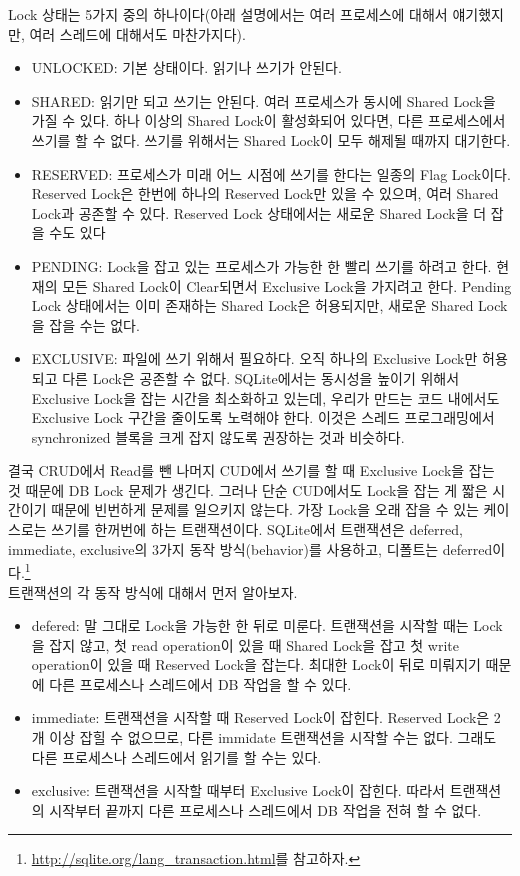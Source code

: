 Lock 상태는 5가지 중의 하나이다(아래 설명에서는 여러 프로세스에 대해서 얘기했지만, 여러 스레드에 대해서도 마찬가지다).
\begin{itemize}
\item UNLOCKED: 기본 상태이다. 읽기나 쓰기가 안된다.
\item SHARED: 읽기만 되고 쓰기는 안된다. 여러 프로세스가 동시에 Shared Lock을 가질 수 있다. 하나 이상의 Shared Lock이 활성화되어 있다면, 다른 프로세스에서 쓰기를 할 수 없다. 쓰기를 위해서는 Shared Lock이 모두 해제될 때까지 대기한다.
\item RESERVED: 프로세스가 미래 어느 시점에 쓰기를 한다는 일종의 Flag Lock이다. Reserved Lock은 한번에 하나의 Reserved Lock만 있을 수 있으며, 여러 Shared Lock과 공존할 수 있다. Reserved Lock 상태에서는 새로운 Shared Lock을 더 잡을 수도 있다 
\item PENDING: Lock을 잡고 있는 프로세스가 가능한 한 빨리 쓰기를 하려고 한다. 현재의 모든 Shared Lock이 Clear되면서 Exclusive Lock을 가지려고 한다. Pending Lock 상태에서는 이미 존재하는 Shared Lock은 허용되지만, 새로운 Shared Lock을 잡을 수는 없다. 
\item EXCLUSIVE: 파일에 쓰기 위해서 필요하다. 오직 하나의 Exclusive Lock만 허용되고 다른 Lock은 공존할 수 없다. SQLite에서는 동시성을 높이기 위해서 Exclusive Lock을 잡는 시간을 최소화하고 있는데, 우리가 만드는 코드 내에서도 Exclusive Lock 구간을 줄이도록 노력해야 한다. 이것은 스레드 프로그래밍에서 synchronized 블록을 크게 잡지 않도록 권장하는 것과 비슷하다. 
\end{itemize}

결국 CRUD에서 Read를 뺀 나머지 CUD에서 쓰기를 할 때 Exclusive Lock을 잡는 것 때문에 DB Lock 문제가 생긴다. 
그러나 단순 CUD에서도 Lock을 잡는 게 짧은 시간이기 때문에 빈번하게 문제를 일으키지 않는다. 
가장 Lock을 오래 잡을 수 있는 케이스로는 쓰기를 한꺼번에 하는 트랜잭션이다.
SQLite에서 트랜잭션은 deferred, immediate, exclusive의 3가지 동작 방식(behavior)를 사용하고, 디폴트는 deferred이다.\footnote{\url{http://sqlite.org/lang\_transaction.html}를 참고하자.}\\

트랜잭션의 각 동작 방식에 대해서 먼저 알아보자.
\begin{itemize}
\item defered: 말 그대로 Lock을 가능한 한 뒤로 미룬다. 트랜잭션을 시작할 때는 Lock을 잡지 않고, 첫 read operation이 있을 때 Shared Lock을 잡고 첫 write operation이 있을 때 Reserved Lock을 잡는다. 최대한 Lock이 뒤로 미뤄지기 때문에 다른 프로세스나 스레드에서 DB 작업을 할 수 있다. 
\item immediate: 트랜잭션을 시작할 때 Reserved Lock이 잡힌다. Reserved Lock은 2개 이상 잡힐 수 없으므로, 다른 immidate 트랜잭션을 시작할 수는 없다. 그래도 다른 프로세스나 스레드에서 읽기를 할 수는 있다.
\item exclusive: 트랜잭션을 시작할 때부터 Exclusive Lock이 잡힌다. 따라서 트랜잭션의 시작부터 끝까지 다른 프로세스나 스레드에서 DB 작업을 전혀 할 수 없다.
\end{itemize}

